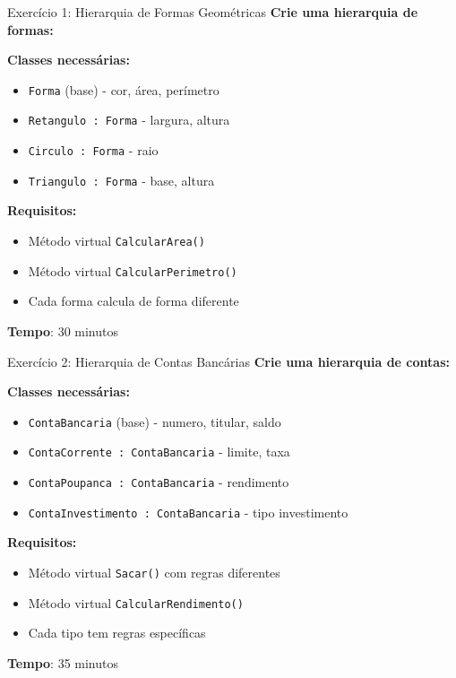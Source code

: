 \documentclass[aspectratio=169]{beamer}
\begin{document}
\begin{frame}{Exercício 1: Hierarquia de Formas Geométricas}
\textbf{Crie uma hierarquia de formas:}

\textbf{Classes necessárias:}
\begin{itemize}
\item \texttt{Forma} (base) - cor, área, perímetro
\item \texttt{Retangulo : Forma} - largura, altura
\item \texttt{Circulo : Forma} - raio
\item \texttt{Triangulo : Forma} - base, altura
\end{itemize}

\textbf{Requisitos:}
\begin{itemize}
\item Método virtual \texttt{CalcularArea()}
\item Método virtual \texttt{CalcularPerimetro()}
\item Cada forma calcula de forma diferente
\end{itemize}

\vspace{0.3cm}
\textbf{Tempo}: 30 minutos
\end{frame}

\begin{frame}{Exercício 2: Hierarquia de Contas Bancárias}
\textbf{Crie uma hierarquia de contas:}

\textbf{Classes necessárias:}
\begin{itemize}
\item \texttt{ContaBancaria} (base) - numero, titular, saldo
\item \texttt{ContaCorrente : ContaBancaria} - limite, taxa
\item \texttt{ContaPoupanca : ContaBancaria} - rendimento
\item \texttt{ContaInvestimento : ContaBancaria} - tipo investimento
\end{itemize}

\textbf{Requisitos:}
\begin{itemize}
\item Método virtual \texttt{Sacar()} com regras diferentes
\item Método virtual \texttt{CalcularRendimento()}
\item Cada tipo tem regras específicas
\end{itemize}

\vspace{0.3cm}
\textbf{Tempo}: 35 minutos
\end{frame}
\end{document}

